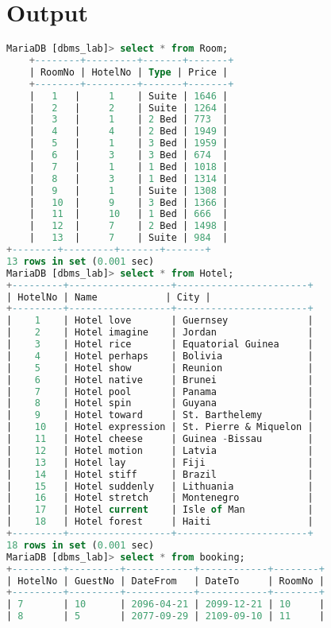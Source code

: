 \documentclass{article}
\begin{document}
\section{\textbf{Output}}
\begin{lstlisting}[language=SQL]
    MariaDB [dbms_lab]> select * from Room; 
    +--------+---------+-------+-------+
    | RoomNo | HotelNo | Type | Price | 
    +--------+---------+-------+-------+
    |   1   |     1    | Suite | 1646 |
    |   2   |     2    | Suite | 1264 |
    |   3   |     1    | 2 Bed | 773  |
    |   4   |     4    | 2 Bed | 1949 |
    |   5   |     1    | 3 Bed | 1959 |
    |   6   |     3    | 3 Bed | 674  |
    |   7   |     1    | 1 Bed | 1018 |
    |   8   |     3    | 1 Bed | 1314 |
    |   9   |     1    | Suite | 1308 | 
    |   10  |     9    | 3 Bed | 1366 |
    |   11  |     10   | 1 Bed | 666  |
    |   12  |     7    | 2 Bed | 1498 |
    |   13  |     7    | Suite | 984  |
+--------+---------+-------+-------+ 
13 rows in set (0.001 sec)
MariaDB [dbms_lab]> select * from Hotel;
+---------+------------------+-----------------------+ 
| HotelNo | Name            | City |
+---------+------------------+-----------------------+ 
|    1    | Hotel love       | Guernsey              |
|    2    | Hotel imagine    | Jordan                |
|    3    | Hotel rice       | Equatorial Guinea     |
|    4    | Hotel perhaps    | Bolivia               |
|    5    | Hotel show       | Reunion               |
|    6    | Hotel native     | Brunei                |
|    7    | Hotel pool       | Panama                |
|    8    | Hotel spin       | Guyana                |
|    9    | Hotel toward     | St. Barthelemy        |
|    10   | Hotel expression | St. Pierre & Miquelon |
|    11   | Hotel cheese     | Guinea -Bissau        |
|    12   | Hotel motion     | Latvia                |
|    13   | Hotel lay        | Fiji                  |
|    14   | Hotel stiff      | Brazil                |
|    15   | Hotel suddenly   | Lithuania             |
|    16   | Hotel stretch    | Montenegro            |
|    17   | Hotel current    | Isle of Man           |
|    18   | Hotel forest     | Haiti                 | 
+---------+------------------+-----------------------+
18 rows in set (0.001 sec)
MariaDB [dbms_lab]> select * from booking; 
+---------+---------+------------+------------+--------+
| HotelNo | GuestNo | DateFrom   | DateTo     | RoomNo | 
+---------+---------+------------+------------+--------+
| 7       | 10      | 2096-04-21 | 2099-12-21 | 10     |
| 8       | 5       | 2077-09-29 | 2109-09-10 | 11     |

\end{lstlisting}
\end{document}
